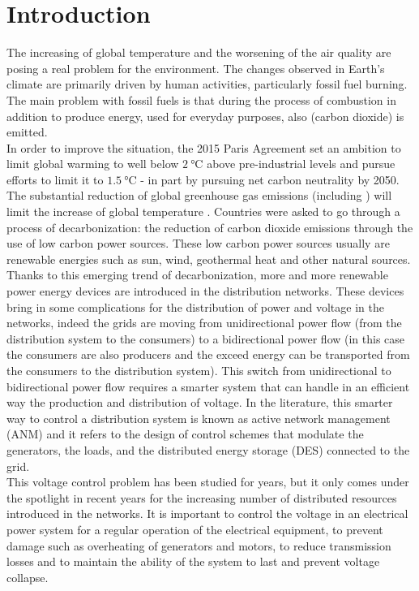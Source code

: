 \chapter{Introduction}
The increasing of global temperature and the worsening of the air quality are posing a real problem for the environment. The changes observed in Earth’s climate are primarily driven by human activities, particularly fossil fuel burning. The main problem with fossil fuels is that during the process of combustion in addition to produce energy, used for everyday purposes, also  (carbon dioxide) is emitted.\\
In order to improve the situation, the 2015 Paris Agreement set an ambition to limit global warming to well below $\SI{2}{\degreeCelsius}$ above pre-industrial levels and pursue efforts to limit it to $\SI{1.5}{\degreeCelsius}$ - in part by pursuing net carbon neutrality by 2050. The substantial reduction of global greenhouse gas emissions (including )  will limit the increase of global temperature \cite{french_conference}. Countries were asked to go through a process of decarbonization: the reduction of carbon dioxide emissions through the use of low carbon power sources. These low carbon power sources usually are renewable energies such as sun, wind, geothermal heat and other natural sources. \\
Thanks to this emerging trend of decarbonization, more and more renewable power energy devices are introduced in the distribution networks. These devices bring in some complications for the distribution of power and voltage in the networks, indeed the grids are moving from unidirectional power flow (from the distribution system to the consumers) to a bidirectional power flow (in this case the consumers are also producers and the exceed energy can be transported from the consumers to the distribution system). This switch from unidirectional to bidirectional power flow requires a smarter system that can handle in an efficient way the production and distribution of voltage. In the literature, this smarter way to control a distribution system is known as active network management (\gls{ANM}) and it refers to the design of control schemes that modulate the generators, the loads, and the distributed energy storage (\gls{DES}) connected to the grid. \\
This voltage control problem has been studied for years, but it only comes under the spotlight in recent years for the increasing number of distributed resources introduced in the networks. It is important to control the voltage in an electrical power system for a regular operation of the electrical equipment, to prevent damage such as overheating of generators and motors, to reduce transmission losses and to maintain the ability of the system to last and prevent voltage collapse.
